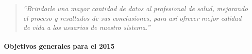 \begin{quote}
\textit{ ``Brindarle una mayor cantidad de datos al profesional de salud, mejorando el proceso y resultados de sus conclusiones, para así ofrecer mejor calidad de vida a los usuarios de nuestro sistema.''}
 \end{quote}

\paragraph{Objetivos generales para el 2015} 
 
